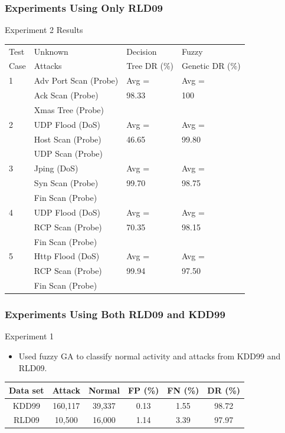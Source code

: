 \documentclass{beamer}
\begin{document}
\begin{frame}
	\frametitle{Experiments Using Only RLD09}
	Experiment 2 Results
	
\begin{table}
\begin{footnotesize}
\begin{tabular}{llll}
Test & Unknown & Decision & Fuzzy\\
Case & Attacks & Tree DR (\%) & Genetic DR (\%)\\ \hline

1 & Adv Port Scan (Probe) & Avg = & Avg =\\
  & Ack Scan (Probe)                 & 98.33 & 100\\
  & Xmas Tree (Probe)                 &                 &\\ \hline

2 & UDP Flood (DoS) & Avg = & Avg =\\
  & Host Scan (Probe) & 46.65 & 99.80\\
  & UDP Scan (Probe) & &\\ \hline

3 & Jping (DoS) & Avg = & Avg =\\
  & Syn Scan (Probe) & 99.70 & 98.75\\
  & Fin Scan (Probe) & &\\ \hline

4 & UDP Flood (DoS) & Avg = & Avg =\\
  & RCP Scan (Probe) & 70.35 & 98.15\\
  & Fin Scan (Probe) & &\\ \hline

5 & Http Flood (DoS) & Avg = & Avg =\\
  & RCP Scan (Probe) & 99.94 & 97.50\\
  & Fin Scan (Probe) & &\\
\hline\end{tabular}
\end{footnotesize}
\end{table}
	
\end{frame}


\begin{frame}
	\frametitle{Experiments Using Both RLD09 and KDD99}
Experiment 1
	\begin{itemize}
		\item Used fuzzy GA to classify normal activity and attacks from KDD99 and RLD09.
	\end{itemize}
	
\begin{table}
\begin{tabular}{cccccc}
Data set & Attack & Normal & FP (\%) & FN (\%) & DR (\%)\\ \hline
KDD99 & 160,117 & 39,337 & 0.13 & 1.55 & 98.72\\
RLD09 & 10,500 & 16,000 & 1.14 & 3.39 & 97.97\\
\end{tabular}
\end{table}
\end{frame}
\end{document}
